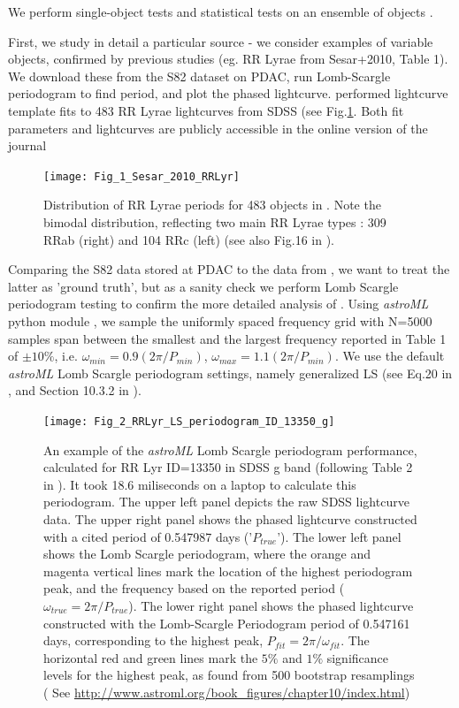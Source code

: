 \documentclass[fleqn,usenatbib]{mnras} %
\begin{document}
We perform single-object tests and statistical tests on an ensemble of objects . 

First, we study in detail a particular source - we consider examples of variable objects, confirmed by previous studies (eg. RR Lyrae from Sesar+2010, Table 1). We download these from the S82 dataset on PDAC, run Lomb-Scargle periodogram to find period, and plot the phased lightcurve. \cite{sesar2010}  performed lightcurve template fits to 483 RR Lyrae lightcurves from SDSS (see Fig.\ref{fig:RRLyr_distribution}. Both fit parameters and lightcurves are publicly accessible in the online version of the journal%

\begin{figure}
\texttt{[image: Fig\_1\_Sesar\_2010\_RRLyr]}
\caption{ Distribution of RR Lyrae periods  for 483 objects in \citep{sesar2010}. Note the bimodal distribution, reflecting two main RR Lyrae types : 309 RRab (right) and 104 RRc (left) (see also Fig.16 in \citep{sesar2010}).}
\label{fig:RRLyr_distribution}
\end{figure}

Comparing the S82 data stored at PDAC to the data from \cite{sesar2010},  we want to treat the latter as 'ground truth', but as a sanity check we perform Lomb Scargle periodogram testing to confirm the more detailed analysis of \cite{sesar2010}. Using {\it astroML} python module \citep{astroML}, we sample the uniformly spaced frequency grid with N=5000 samples span between the smallest and the largest frequency reported in Table 1 of \cite{sesar2010} $\pm 10\%$, i.e. $\omega_{min} = 0.9 ( 2 \pi / P_{min})$, $\omega_{max} = 1.1 ( 2 \pi / P_{min})$. We use the default {\it astroML} Lomb Scargle periodogram settings, namely generalized LS (see Eq.20 in \cite{zechmeister2009}, and Section 10.3.2 in \cite{ivezic2014}).   



\begin{figure}
\texttt{[image: Fig\_2\_RRLyr\_LS\_periodogram\_ID\_13350\_g]}
\caption{ An example of the  {\it astroML} Lomb Scargle periodogram performance,  calculated for RR Lyr ID=13350  in SDSS g band (following Table 2 in \citep{sesar2010}). It took 18.6 miliseconds on a laptop to calculate this periodogram. The upper left panel depicts the raw  SDSS lightcurve data. The upper right panel shows the phased lightcurve constructed with a cited period of 0.547987 days ('$P_{true}$'). The lower left panel shows the Lomb Scargle periodogram, where the orange and magenta vertical lines mark the location of the highest periodogram peak, and the frequency based on the reported period ($\omega_{true} = 2 \pi / P_{true}$). The lower right panel shows the phased lightcurve constructed with the Lomb-Scargle Periodogram period of 0.547161 days,  corresponding to the highest peak, $P_{fit} = 2 \pi / \omega_{fit}$. The horizontal red and green lines mark the $5\%$ and $1\%$  significance levels for the highest peak, as found from 500 bootstrap resamplings ( See \url{http://www.astroml.org/book\_figures/chapter10/index.html}) }
\label{fig:RRLyr_periodogram_good}
\end{figure}
%
\end{document}
